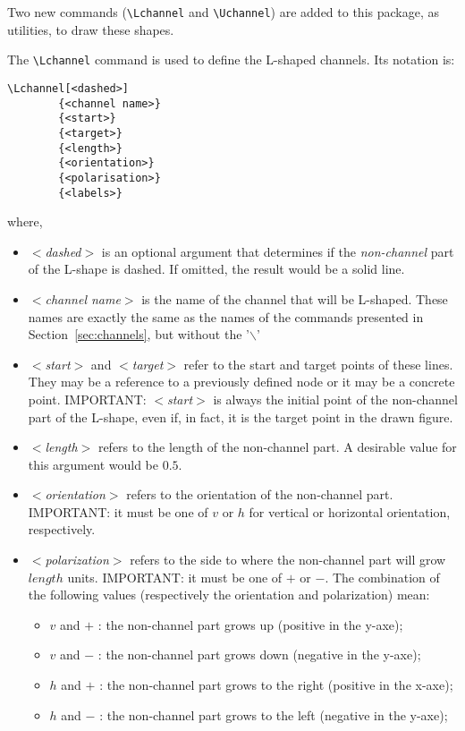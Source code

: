 \documentclass[11pt]{article}
\begin{document}
\bigskip

Two new commands (\verb+\Lchannel+ and \verb+\Uchannel+) are added to this package, as utilities, to draw these shapes.

The \verb+\Lchannel+ command is used to define the L-shaped channels. Its notation is:

\begin{verbatim}
\Lchannel[<dashed>]
        {<channel name>}
        {<start>}
        {<target>}
        {<length>}
        {<orientation>}
        {<polarisation>}
        {<labels>}
\end{verbatim}

where,

\begin{itemize}
\item \emph{$<$dashed$>$} is an optional argument that determines if the \emph{non-channel} part of the L-shape is dashed. If omitted, the result would be a solid line.

\item \emph{$<$channel name$>$} is the name of the channel that will be L-shaped. These names are exactly the same as the names of the commands presented in Section~\ref{sec:channels}, but without the '$\backslash $'

\item \emph{$<$start$>$} and \emph{$<$target$>$} refer to the start and target points of these lines. They may be a reference to a previously defined node or it may be a concrete point. IMPORTANT: \emph{$<$start$>$} is always the initial point of the non-channel part of the L-shape, even if, in fact, it is the target point in the drawn figure.

\item \emph{$<$length$>$} refers to the length of the non-channel part. A desirable value for this argument would be $0.5$.

\item \emph{$<$orientation$>$} refers to the orientation of the non-channel part. IMPORTANT: it must be one of $v$ or $h$ for vertical or horizontal orientation, respectively. 

\item \emph{$<$polarization$>$} refers to the side to where the non-channel part will grow $length$ units. IMPORTANT: it must be one of $+$ or $-$. 
The combination of the following values (respectively the orientation and polarization) mean:
\begin{itemize}
\item  $v$ and $+$ : the non-channel part grows up (positive in the y-axe);
\item  $v$ and $-$ : the non-channel part grows down (negative in the y-axe);
\item  $h$ and $+$ : the non-channel part grows to the right (positive in the x-axe);
\item  $h$ and $-$ : the non-channel part grows to the left (negative in the y-axe);
\end{itemize}


\end{itemize}
\end{document}
